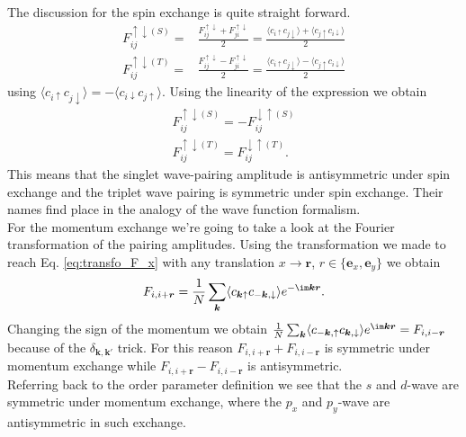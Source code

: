 \documentclass[../main.tex]{subfile}
\begin{document}
The discussion for the spin exchange is quite straight forward.
\begin{align*}
    F_{ij}^{\uparrow\downarrow(S)} =& \frac{F_{ij}^{\uparrow\downarrow} + F_{ji}^{\uparrow\downarrow}}{2} = \frac{\langle c_{i\uparrow}c_{j\downarrow}\rangle + \langle c_{j\uparrow}c_{i\downarrow}\rangle}{2}\\
    F_{ij}^{\uparrow\downarrow(T)} =& \frac{F_{ij}^{\uparrow\downarrow} - F_{ji}^{\uparrow\downarrow}}{2} = \frac{\langle c_{i\uparrow}c_{j\downarrow}\rangle - \langle c_{j\uparrow}c_{i\downarrow}\rangle}{2}
\end{align*}
 using $\langle c_{i\uparrow}c_{j\downarrow}\rangle = -\langle c_{i\downarrow}c_{j\uparrow}\rangle$. Using the linearity of the expression we obtain
\begin{align*}
    F_{ij}^{\uparrow\downarrow(S)} = - F_{ij}^{\downarrow\uparrow(S)}\\
    F_{ij}^{\uparrow\downarrow(T)} = F_{ij}^{\downarrow\uparrow(T)}.
\end{align*}
This means that the singlet wave-pairing amplitude is antisymmetric under spin exchange and the triplet wave pairing is symmetric under spin exchange. Their names
find place in the analogy of the wave function formalism.\\

For the momentum exchange we're going to take a look at the Fourier transformation of the pairing amplitudes. Using the transformation we made to 
reach Eq. \ref{eq:transfo_F_x} with any translation $ x \rightarrow \bm{r}$, $r\in \{\bm{e}_x,\bm{e}_y\}$ we obtain
\begin{align*}
    F_{i,i+ \bm{r}} = \frac{1}{N} \sum_{\bm{k}} \langle c_{\bm{k}\uparrow} c_{-\bm{k},\downarrow}\rangle e^{-\im\bm{k}\bm{r}}.
\end{align*}
Changing the sign of the momentum we obtain  $\frac{1}{N} \sum_{\bm{k}} \langle c_{-\bm{k},\uparrow} c_{\bm{k},\downarrow}\rangle e^{\im\bm{k}\bm{r}} =  F_{i,i- \bm{r}}$
because of the $\delta_{\bm{k},\bm{k}'}$ trick. For this reason $F_{i,i+ \bm{r}} +  F_{i,i- \bm{r}}$ is symmetric under momentum exchange while $F_{i,i+ \bm{r}} -  F_{i,i- \bm{r}}$ is antisymmetric.\\
Referring back to the order parameter definition we see that the $s$ and $d$-wave are symmetric under momentum exchange, where the $p_x$ and $p_y$-wave are antisymmetric in such exchange.\\
\end{document}
